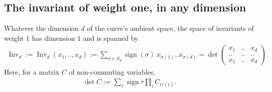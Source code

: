 \documentclass{scrartcl}
\theoremstyle{plain}
\theoremstyle{definition}
\newcommand{\1}[1]{1_{\{#1\}}}
\newcommand{\ds}{d} %
\newcommand{\sign}{\operatorname{sign}}
\begin{document}



\subsection{The invariant of weight one, in any dimension}
\label{sec:dXw1}

Whatever the dimension $\ds$ of the curve's ambient space, the space of invariants of weight $1$ has dimension $1$ and is spanned by
\newcommand{\firstInvariant}[1]{\operatorname{Inv}_{#1}}
\begin{align}
  \label{eq:firstInvariant}
  \firstInvariant{\ds} :=
  \firstInvariant{\ds}(x_1,..,x_\ds) :=
  \sum_{\sigma \in S_\ds}
  \sign(\sigma)\
  x_{\sigma(1)} .. x_{\sigma(d)}
  =
  \det
  \begin{pmatrix}
    x_1 & .. & x_\ds \\
    .. & ..  & .. \\
    x_1 & .. & x_\ds
  \end{pmatrix}.
\end{align}
Here, for a matrix $C$ of non-commuting variables,
\begin{align*}
  \det C := \sum_\tau \sign \tau \prod_i C_{i \tau(i)}.
\end{align*}
\end{document}
